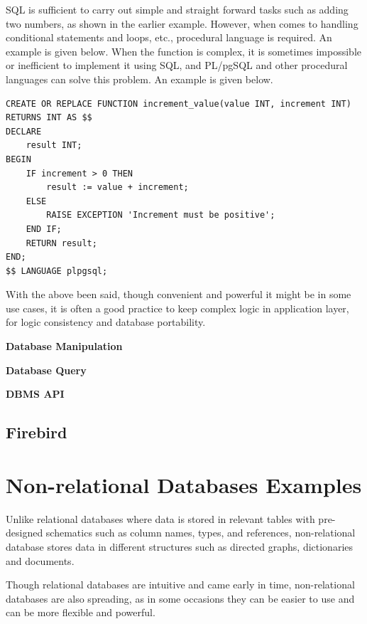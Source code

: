 SQL is sufficient to carry out simple and straight forward tasks such as adding two numbers, as shown in the earlier example. However, when comes to handling conditional statements and loops, etc., procedural language is required. An example is given below. When the function is complex, it is sometimes impossible or inefficient to implement it using SQL, and PL/pgSQL and other procedural languages can solve this problem. An example is given below.
\begin{lstlisting}
CREATE OR REPLACE FUNCTION increment_value(value INT, increment INT) 
RETURNS INT AS $$
DECLARE
	result INT;
BEGIN
	IF increment > 0 THEN
		result := value + increment;
	ELSE
		RAISE EXCEPTION 'Increment must be positive';
	END IF;
	RETURN result;
END;
$$ LANGUAGE plpgsql;
\end{lstlisting}

With the above been said, though convenient and powerful it might be in some use cases, it is often a good practice to keep complex logic in application layer, for logic consistency and database portability. 

\vspace{0.1in}
\noindent \textbf{Database Manipulation}
\vspace{0.1in}

\vspace{0.1in}
\noindent \textbf{Database Query}
\vspace{0.1in}

\vspace{0.1in}
\noindent \textbf{DBMS API}
\vspace{0.1in}

\subsection{Firebird}

\section{Non-relational Databases Examples}

Unlike relational databases where data is stored in relevant tables with pre-designed schematics such as column names, types, and references, non-relational database stores data in different structures such as directed graphs, dictionaries and documents. 

Though relational databases are intuitive and came early in time, non-relational databases are also spreading, as in some occasions they can be easier to use and can be more flexible and powerful. 

